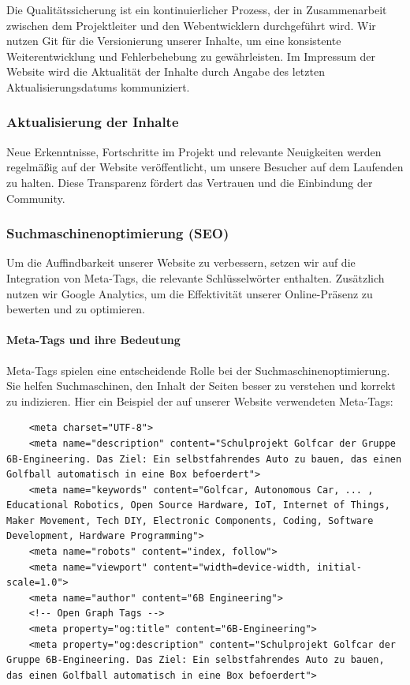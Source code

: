 Die Qualitätssicherung ist ein kontinuierlicher Prozess, der in Zusammenarbeit zwischen dem Projektleiter und den Webentwicklern durchgeführt wird. Wir nutzen Git für die Versionierung unserer Inhalte, um eine konsistente Weiterentwicklung und Fehlerbehebung zu gewährleisten. Im Impressum der Website wird die Aktualität der Inhalte durch Angabe des letzten Aktualisierungsdatums kommuniziert.

\subsubsection{Aktualisierung der Inhalte}

Neue Erkenntnisse, Fortschritte im Projekt und relevante Neuigkeiten werden regelmäßig auf der Website veröffentlicht, um unsere Besucher auf dem Laufenden zu halten. Diese Transparenz fördert das Vertrauen und die Einbindung der Community.

\subsubsection{Suchmaschinenoptimierung (SEO)}

Um die Auffindbarkeit unserer Website zu verbessern, setzen wir auf die Integration von Meta-Tags, die relevante Schlüsselwörter enthalten. Zusätzlich nutzen wir Google Analytics, um die Effektivität unserer Online-Präsenz zu bewerten und zu optimieren.

\paragraph{Meta-Tags und ihre Bedeutung}
Meta-Tags spielen eine entscheidende Rolle bei der Suchmaschinenoptimierung. Sie helfen Suchmaschinen, den Inhalt der Seiten besser zu verstehen und korrekt zu indizieren. Hier ein Beispiel der auf unserer Website verwendeten Meta-Tags:

\begin{lstlisting}
    <meta charset="UTF-8">
    <meta name="description" content="Schulprojekt Golfcar der Gruppe 6B-Engineering. Das Ziel: Ein selbstfahrendes Auto zu bauen, das einen Golfball automatisch in eine Box befoerdert">
    <meta name="keywords" content="Golfcar, Autonomous Car, ... , Educational Robotics, Open Source Hardware, IoT, Internet of Things, Maker Movement, Tech DIY, Electronic Components, Coding, Software Development, Hardware Programming">
    <meta name="robots" content="index, follow">
    <meta name="viewport" content="width=device-width, initial-scale=1.0">
    <meta name="author" content="6B Engineering">
    <!-- Open Graph Tags -->
    <meta property="og:title" content="6B-Engineering">
    <meta property="og:description" content="Schulprojekt Golfcar der Gruppe 6B-Engineering. Das Ziel: Ein selbstfahrendes Auto zu bauen, das einen Golfball automatisch in eine Box befoerdert">
    \end{lstlisting}

